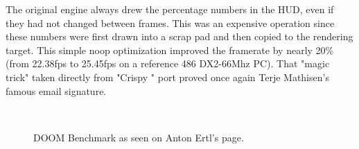 \par
The original engine always drew the percentage numbers in the HUD, even if they had not changed between frames. This was an expensive operation since these numbers were first drawn into a scrap pad and then copied to the rendering target. This simple noop optimization improved the framerate by nearly 20\% (from 22.38fps to 25.45fps on a reference 486 DX2-66Mhz PC).
That "magic trick" taken directly from "Crispy \doom{}" port proved once again Terje Mathisen's famous email signature.\\
\par
{}\\
\par
\vspace{4mm}

\begin{figure}[H]
\centering  
{}
\caption{DOOM Benchmark as seen on Anton Ertl's \doom{} page.}
\end{figure}

